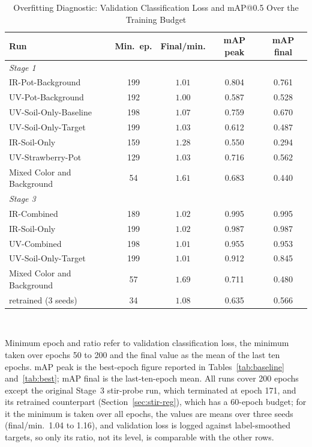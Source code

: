 ﻿\documentclass[journal]{IEEEtran}
\begin{document}
\begin{table}[!t]
\renewcommand{\arraystretch}{1.3}
\caption{Overfitting Diagnostic: Validation Classification Loss and mAP@0.5 Over the Training Budget}
\label{tab:overfit}
\centering
\footnotesize
\setlength{\tabcolsep}{3.5pt}
\begin{tabular}{l c c c c}
\toprule
\textbf{Run} & \textbf{Min.\ ep.} & \textbf{Final/min.} & \textbf{mAP peak} & \textbf{mAP final} \\
\midrule
\multicolumn{5}{l}{\emph{Stage 1}} \\
IR-Pot-Background & 199 & $1.01$ & 0.804 & 0.761 \\
UV-Pot-Background & 192 & $1.00$ & 0.587 & 0.528 \\
UV-Soil-Only-Baseline & 198 & $1.07$ & 0.759 & 0.670 \\
UV-Soil-Only-Target & 199 & $1.03$ & 0.612 & 0.487 \\
IR-Soil-Only & 159 & $1.28$ & 0.550 & 0.294 \\
UV-Strawberry-Pot & 129 & $1.03$ & 0.716 & 0.562 \\
Mixed Color and Background & 54 & $\mathbf{1.61}$ & 0.683 & 0.440 \\
\midrule
\multicolumn{5}{l}{\emph{Stage 3}} \\
IR-Combined & 189 & $1.02$ & 0.995 & 0.995 \\
IR-Soil-Only & 199 & $1.02$ & 0.987 & 0.987 \\
UV-Combined & 198 & $1.01$ & 0.955 & 0.953 \\
UV-Soil-Only-Target & 199 & $1.01$ & 0.912 & 0.845 \\
Mixed Color and Background & 57 & $\mathbf{1.69}$ & 0.711 & 0.480 \\
\quad retrained (3 seeds) & 34 & $1.08$ & 0.635 & 0.566 \\
\bottomrule
\end{tabular}
\\[2pt]
\parbox{\columnwidth}{\footnotesize Minimum epoch and ratio refer to validation classification loss, the minimum taken over epochs 50 to 200 and the final value as the mean of the last ten epochs. mAP peak is the best-epoch figure reported in Tables~\ref{tab:baseline} and~\ref{tab:best}; mAP final is the last-ten-epoch mean. All runs cover 200 epochs except the original Stage~3 stir-probe run, which terminated at epoch 171, and its retrained counterpart (Section~\ref{sec:stir-reg}), which has a 60-epoch budget; for it the minimum is taken over all epochs, the values are means over three seeds (final/min.\ 1.04 to 1.16), and validation loss is logged against label-smoothed targets, so only its ratio, not its level, is comparable with the other rows.}
\end{table}
\end{document}
